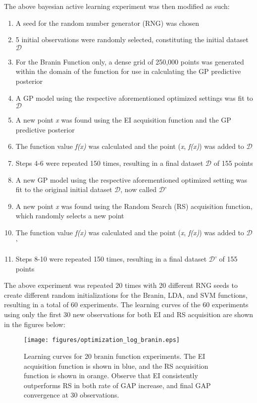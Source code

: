 \documentclass[11pt]{article}
\numberwithin{equation}{section}
\begin{document}
The above bayesian active learning experiment was then modified as such:
\begin{enumerate}
  \item A seed for the random number generator (RNG) was chosen
  \item 5 initial observations were randomly selected, constituting the initial dataset $\mathcal{D}$
  \item For the Branin Function only, a dense grid of 250,000 points was generated within the domain of the function for use in calculating the GP predictive posterior
  \item A GP model using the respective aforementioned optimized settings was fit to $\mathcal{D}$
  \item A new point \emph{x} was found using the EI acquisition function and the GP predictive posterior
  \item The function value \emph{f(x)} was calculated and the point (\emph{x}, \emph{f(x)}) was added to $\mathcal{D}$
  \item Steps 4-6 were repeated 150 times, resulting in a final dataset $\mathcal{D}$ of 155 points
  \item A new GP model using the respective aforementioned optimized setting was fit to the original initial dataset $\mathcal{D}$, now called $\mathcal{D}$'
  \item A new point \emph{x} was found using the Random Search (RS) acquisition function, which randomly selects a new point
  \item The function value \emph{f(x)} was calculated and the point (\emph{x}, \emph{f(x)}) was added to $\mathcal{D}$'
  \item Steps 8-10 were repeated 150 times, resulting in a final dataset $\mathcal{D}$' of 155 points
\end{enumerate}
The above experiment was repeated 20 times with 20 different RNG seeds to create different random initializations for the Branin, LDA, and SVM functions, resulting in a total of 60 experiments. 
The learning curves of the 60 experiments using only the first 30 new observations for both EI and RS acquisition are shown in the figures below:
\begin{figure}[H]
  \centering
  \texttt{[image: figures/optimization\_log\_branin.eps]}
  \caption{Learning curves for 20 branin function experiments. The EI acquisition function is shown in blue, and the RS acquisition function is shown in orange. 
  Observe that EI consistently outperforms RS in both rate of GAP increase, and final GAP convergence at 30 observations.}
  \label{fig:ei-v-rand-branin}
\end{figure}
\end{document}
